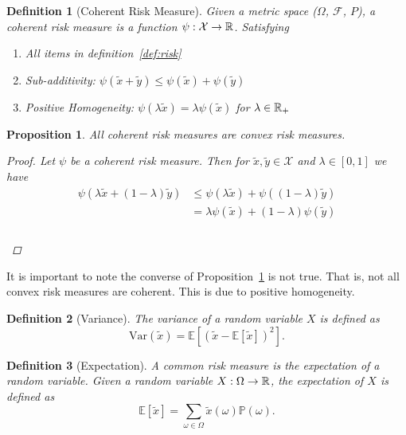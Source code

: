 \documentclass[10pt]{article}
\newtheorem{definition}{Definition}
\theoremstyle{plain}
\newtheorem{proposition}{Proposition}
\theoremstyle{remark}
\begin{document}
\begin{definition}[Coherent Risk Measure]\label{def:coherent-risk-measure}
        Given a metric space ($\Omega$, $\mathcal{F}$, $P$), a coherent risk measure is a function $\psi: \mathcal{X} \to \mathbb{R}$. Satisfying
        \begin{enumerate}
                \item All items in definition~\ref{def:risk}
                \item Sub-additivity: $\psi(\tilde{x} + \tilde{y}) \leq \psi(\tilde{x}) + \psi(\tilde{y})$
                \item Positive Homogeneity: $\psi(\lambda \tilde{x}) = \lambda \psi(\tilde{x})$ for $\lambda \in \mathbb{R}_+$
        \end{enumerate}
\end{definition}

\begin{proposition}\label{prop:coherent-convex}
        All coherent risk measures are convex risk measures.
        \begin{proof}
          Let $\psi$ be a coherent risk measure. Then for $\tilde{x}, \tilde{y} \in \mathcal{X}$ and $\lambda \in [0, 1]$ we have
                \begin{align*}
                  \psi(\lambda \tilde{x} + (1 - \lambda) \tilde{y}) &\leq \psi(\lambda \tilde{x}) + \psi((1 - \lambda) \tilde{y}) \\
                  &= \lambda \psi(\tilde{x}) + (1 - \lambda) \psi(\tilde{y}) \\
                \end{align*} \\
        \end{proof}
\end{proposition}

It is important to note the converse of Proposition~\ref{prop:coherent-convex} is not true. That is, not all convex risk measures are coherent. This is due to positive homogeneity.

\begin{definition}[Variance]\label{def:variance}
        The variance of a random variable $X$ is defined as 
        \[
          \text{Var}(\tilde{x}) = \mathbb{E}[(\tilde{x} - \mathbb{E}[\tilde{x}])^2].
        \]
\end{definition}

\begin{definition}[Expectation]
        \label{def:expectation}
        A common risk measure is the expectation of a random variable. Given a random variable $X: \Omega \to \mathbb{R}$, the expectation of $X$ is defined as
        \[
          \mathbb{E}[\tilde{x}] = \sum_{\omega \in \Omega} \tilde{x}(\omega) \mathbb{P}(\omega).
        \]
\end{definition}
\end{document}
